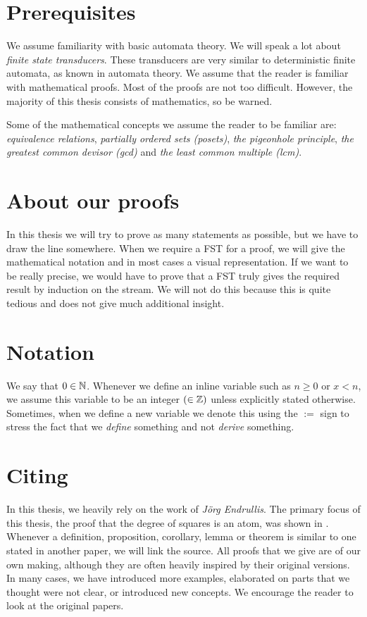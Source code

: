 \section{Prerequisites}
We assume familiarity with basic automata theory. We will speak a lot about \textit{finite state transducers}. These transducers are very similar to deterministic finite automata, as known in automata theory. We assume that the reader is familiar with mathematical proofs. Most of the proofs are not too difficult. However, the majority of this thesis consists of mathematics, so be warned.

Some of the mathematical concepts we assume the reader to be familiar are: 
\textit{equivalence relations}, 
\textit{partially ordered sets (posets)}, 
\textit{the pigeonhole principle}, 
\textit{the greatest common devisor (gcd)}
and
\textit{the least common multiple (lcm)}.

\section{About our proofs}
In this thesis we will try to prove as many statements as possible, but we have to draw the line somewhere. When we require a FST for a proof, we will give the mathematical notation and in most cases a visual representation. If we want to be really precise, we would have to prove that a FST truly gives the required result by induction on the stream. We will not do this because this is quite tedious and does not give much additional insight.

\section{Notation}
We say that $0\in\mathbb{N}$. Whenever we define an inline variable such as $n \geq 0$ or $x < n$, we assume this variable to be an integer $(\in\mathbb{Z})$ unless explicitly stated otherwise. Sometimes, when we define a new variable we denote this using the $:=$ sign to stress the fact that we \textit{define} something and not \textit{derive} something. 

\section{Citing}
In this thesis, we heavily rely on the work of \textit{Jörg Endrullis}. The primary focus of this thesis, the proof that the degree of squares is an atom, was shown in \cite{streams:degrees:squares:2015}. Whenever a definition, proposition, corollary, lemma or theorem is similar to one stated in another paper, we will link the source. All proofs that we give are of our own making, although they are often heavily inspired by their original versions. In many cases, we have introduced more examples, elaborated on parts that we thought were not clear, or introduced new concepts. We encourage the reader to look at the original papers.
